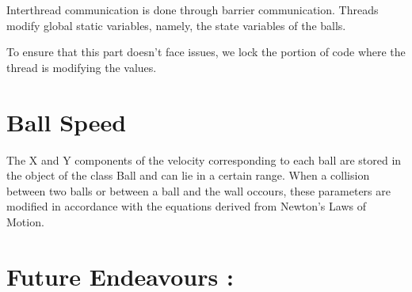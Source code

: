 \documentclass[]{article}
\begin{document}
Interthread communication is done through barrier communication. Threads modify global static variables, namely, the state variables of the balls.

To ensure that this part doesn't face issues, we lock the portion of code where the thread is modifying the values.

\begin{flushleft}


\end{flushleft}

\section{Ball Speed}

\begin{flushleft}

The X and Y components of the velocity corresponding to each ball are stored in the  object of the class Ball and can lie in a certain range. When a collision between two balls or between a ball and the wall occours, these parameters are modified in accordance with the equations derived from Newton's Laws of Motion.  

\end{flushleft}


\section{Future Endeavours :}
\end{document}
